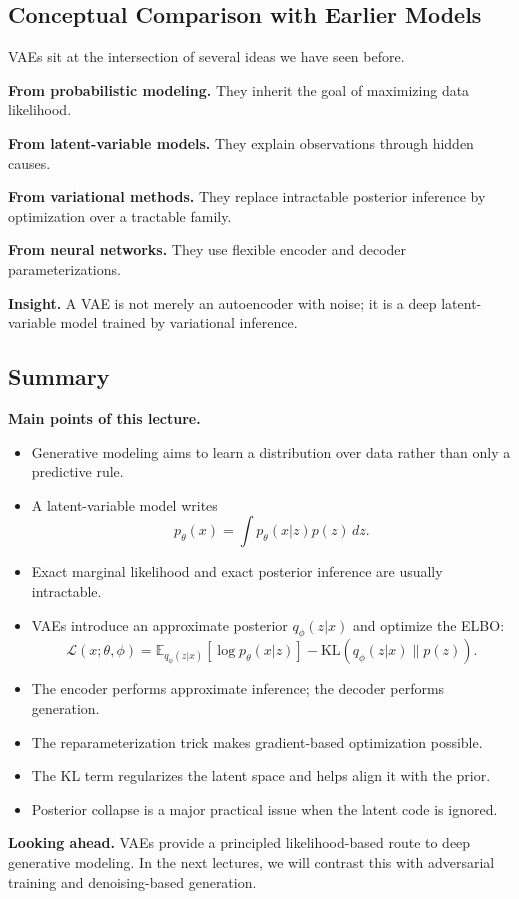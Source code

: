 \subsection{Conceptual Comparison with Earlier Models}

VAEs sit at the intersection of several ideas we have seen before.

\medskip

\noindent
\textbf{From probabilistic modeling.}  
They inherit the goal of maximizing data likelihood.

\medskip

\noindent
\textbf{From latent-variable models.}  
They explain observations through hidden causes.

\medskip

\noindent
\textbf{From variational methods.}  
They replace intractable posterior inference by optimization over a tractable family.

\medskip

\noindent
\textbf{From neural networks.}  
They use flexible encoder and decoder parameterizations.

\medskip

\noindent
\textbf{Insight.}  
A VAE is not merely an autoencoder with noise; it is a deep latent-variable model trained by variational inference.

\subsection{Summary}

\textbf{Main points of this lecture.}

\begin{itemize}
    \item Generative modeling aims to learn a distribution over data rather than only a predictive rule.
    \item A latent-variable model writes
    \[
    p_\theta(x)=\int p_\theta(x|z)p(z)\,dz.
    \]
    \item Exact marginal likelihood and exact posterior inference are usually intractable.
    \item VAEs introduce an approximate posterior $q_\phi(z|x)$ and optimize the ELBO:
    \[
    \mathcal{L}(x;\theta,\phi)
    =
    \mathbb{E}_{q_\phi(z|x)}[\log p_\theta(x|z)]
    -
    \mathrm{KL}(q_\phi(z|x)\|p(z)).
    \]
    \item The encoder performs approximate inference; the decoder performs generation.
    \item The reparameterization trick makes gradient-based optimization possible.
    \item The KL term regularizes the latent space and helps align it with the prior.
    \item Posterior collapse is a major practical issue when the latent code is ignored.
\end{itemize}

\medskip

\noindent
\textbf{Looking ahead.}  
VAEs provide a principled likelihood-based route to deep generative modeling. In the next lectures, we will contrast this with adversarial training and denoising-based generation.